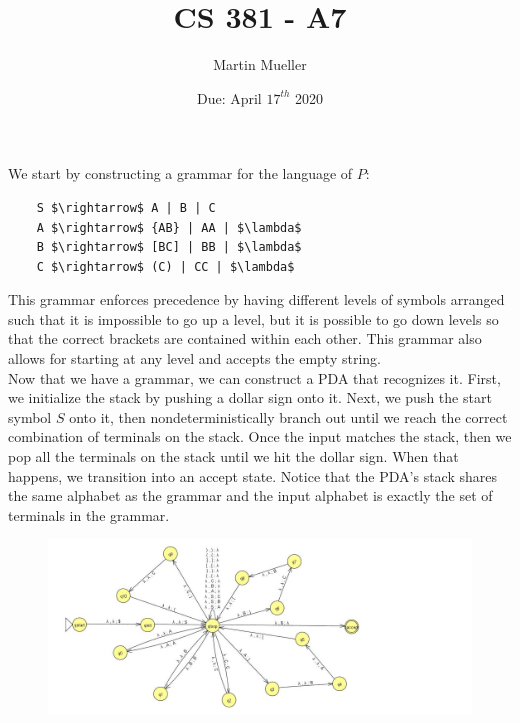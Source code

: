 \documentclass[11pt, letter]{article}
\title{CS 381 - A7}
\author{Martin Mueller}
\date{Due: April $17^{th}$ 2020}
\begin{document}
\maketitle

We start by constructing a grammar for the language of $P$:
\begin{lstlisting}
    S $\rightarrow$ A | B | C
    A $\rightarrow$ {AB} | AA | $\lambda$
    B $\rightarrow$ [BC] | BB | $\lambda$
    C $\rightarrow$ (C) | CC | $\lambda$
\end{lstlisting}
This grammar enforces precedence by having different levels of symbols arranged such that it is impossible to go up a level, but it is possible to go down levels so that the correct brackets are contained within each other. This grammar also allows for starting at any level and accepts the empty string. \\
Now that we have a grammar, we can construct a PDA that recognizes it. First, we initialize the stack by pushing a dollar sign onto it. Next, we push the start symbol $S$ onto it, then nondeterministically branch out until we reach the correct combination of terminals on the stack. Once the input matches the stack, then we pop all the terminals on the stack until we hit the dollar sign. When that happens, we transition into an accept state. Notice that the PDA's stack shares the same alphabet as the grammar and the input alphabet is exactly the set of terminals in the grammar.

\begin{figure}
  \includegraphics[width=\textwidth]{A7.jpg}
\end{figure}
\end{document}
